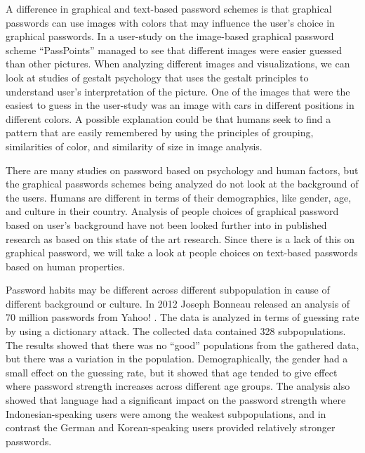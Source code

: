   A difference in graphical and text-based password schemes is that graphical passwords can use images with colors that may influence the user's choice in graphical passwords. In a user-study \cite{Thorpe2} on the image-based graphical password scheme ``PassPoints'' managed to see that different images were easier guessed than other pictures. When analyzing different images and visualizations, we can look at studies of gestalt psychology \cite{Wagemans2} that uses the gestalt principles to understand user's interpretation of the picture. One of the images that were the easiest to guess in the user-study was an image with cars in different positions in different colors. A possible explanation could be that humans seek to find a pattern that are easily remembered by using the principles of grouping, similarities of color, and similarity of size in image analysis.

  There are many studies on password based on psychology and human factors, but the graphical passwords schemes being analyzed do not look at the background of the users. Humans are different in terms of their demographics, like gender, age, and culture in their country. Analysis of people choices of graphical password based on user's background have not been looked further into in published research as based on this state of the art research. Since there is a lack of this on graphical password, we will take a look at people choices on text-based passwords based on human properties.

  Password habits may be different across different subpopulation in cause of different background or culture. In 2012 Joseph Bonneau released an analysis of 70 million passwords from Yahoo! \cite{Bonneau2}. The data is analyzed in terms of guessing rate by using a dictionary attack. The collected data contained 328 subpopulations. The results showed that there was no ``good'' populations from the gathered data, but there was a variation in the population. Demographically, the gender had a small effect on the guessing rate, but it showed that age tended to give effect where password strength increases across different age groups. The analysis also showed that language had a significant impact on the password strength where Indonesian-speaking users were among the weakest subpopulations, and in contrast the German and Korean-speaking users provided relatively stronger passwords.

	